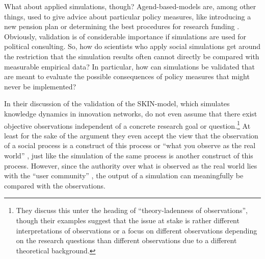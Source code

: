 \documentclass[12pt, a4paper]{article}
\begin{document}
What about applied simulations, though? Agend-based-models are, among
other things, used to give advice about particular policy measures,
like introducing a new pension plan \citep{harding-et-al:2010} or
determining the best procedures for research funding
\citep{ahrweiler-gilbert:2015}. Obviously, validation is of
considerable importance if simulations are used for political
consulting. So, how do scientists who apply social simulations get
around the restriction that the simulation results often cannot
directly be compared with measurable empirical data? In particular,
how can simulations be validated that are meant to evaluate the
possible consequences of policy measures that might never be
implemented?

In their discussion of the validation of the SKIN-model, which
simulates knowledge dynamics in innovation networks, \citet[section
1.1.2]{ahrweiler-gilbert:2015} do not even assume that there exist
objective observations independent of a concrete research goal or
question.\footnote{They discuss this unter the heading of
``theory-ladenness of observations'', though their examples suggest
that the issue at stake is rather different interpretations of
observations or a focus on different observations depending on the
research questions than different observations due to a different
theoretical background.} At least for the sake of the argument they
even accept the view that the observation of a social process is a
construct of this process or ``what you observe as the real world''
\citep[section 1.2]{ahrweiler-gilbert:2015}, just like the simulation
of the same process is another construct of this process. However,
since the authority over what is observed as the real world lies with
the ``user community'' \citep[section 1.3]{ahrweiler-gilbert:2015},
the output of a simulation can meaningfully be compared with the
observations.
\end{document}
